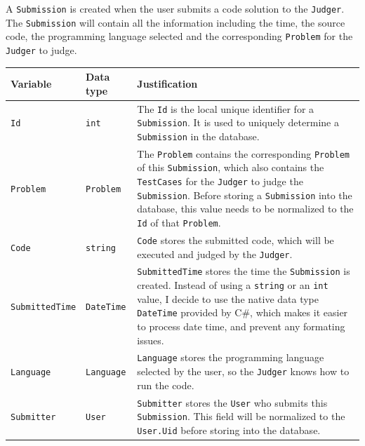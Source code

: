 \documentclass[a4paper]{report}
\begin{document}
A \texttt{Submission} is created when the user submits a code solution to the \texttt{Judger}. The \texttt{Submission} will contain all the information including the time, the source code, the programming language selected and the corresponding \texttt{Problem} for the \texttt{Judger} to judge.

\begin{tabulary}{\textwidth}{|l|l|L|}
    \hline
    Variable & Data type & Justification \\
    \hline
    \texttt{Id} & \texttt{int} & The \texttt{Id} is the local unique identifier for a \texttt{Submission}. It is used to uniquely determine a \texttt{Submission} in the database. \\
    \hline
    \texttt{Problem} & \texttt{Problem} & The \texttt{Problem} contains the corresponding \texttt{Problem} of this \texttt{Submission}, which also contains the \texttt{TestCases} for the \texttt{Judger} to judge the \texttt{Submission}. Before storing a \texttt{Submission} into the database, this value needs to be normalized to the \texttt{Id} of that \texttt{Problem}. \\
    \hline
    \texttt{Code} & \texttt{string} & \texttt{Code} stores the submitted code, which will be executed and judged by the \texttt{Judger}. \\
    \hline
    \texttt{SubmittedTime} & \texttt{DateTime} & \texttt{SubmittedTime} stores the time the \texttt{Submission} is created. Instead of using a \texttt{string} or an \texttt{int} value, I decide to use the native data type \texttt{DateTime} provided by C\#, which makes it easier to process date time, and prevent any formating issues. \\
    \hline
    \texttt{Language} & \texttt{Language} & \texttt{Language} stores the programming language selected by the user, so the \texttt{Judger} knows how to run the code.\\
    \hline
    \texttt{Submitter} & \texttt{User} & \texttt{Submitter} stores the \texttt{User} who submits this \texttt{Submission}. This field will be normalized to the \texttt{User.Uid} before storing into the database. \\
    \hline
\end{tabulary}
\end{document}

